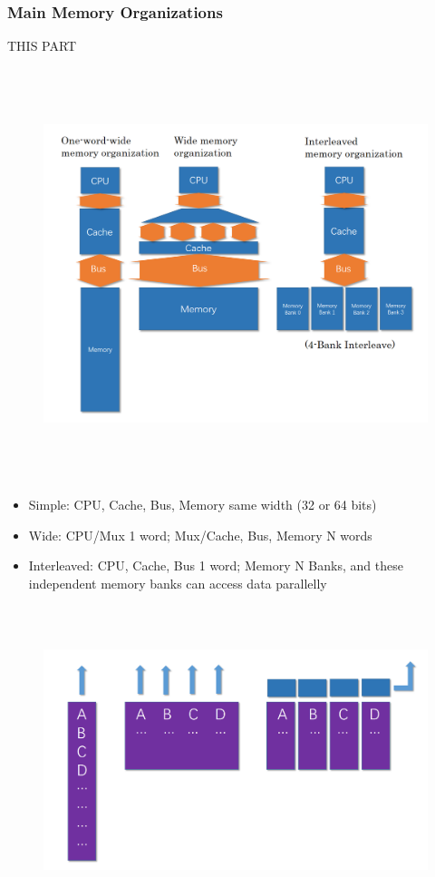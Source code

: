 \documentclass[12pt, a4paper]{article}
\theoremstyle{margin}
\begin{document}
		\subsubsection{Main Memory Organizations}
			THIS PART\cite{ppt}
		  \begin{figure}[H]
				\begin{center}
				  \includegraphics[height=12cm]{memory-organizations.png}
				\end{center}
		  \end{figure}
			\begin{itemize}
				\item Simple: CPU, Cache, Bus, Memory same width (32 or 64 bits)
				\item Wide: CPU/Mux 1 word; Mux/Cache, Bus, Memory N words
				\item Interleaved: CPU, Cache, Bus 1 word; Memory N Banks, and these independent memory banks can access data parallelly
			\end{itemize}
			\begin{figure}[H]
				\begin{center}
				  \includegraphics[height=9cm]{memory-organization-data.png}
				\end{center}
		  \end{figure}
\end{document}
